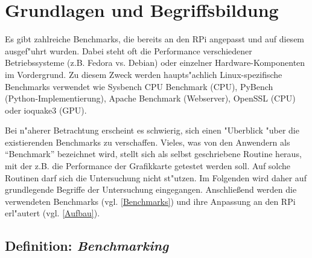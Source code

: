 \chapter{Grundlagen und Begriffsbildung}\label{Kapitel 2}

Es gibt zahlreiche Benchmarks, die bereits an den RPi angepasst und auf diesem ausgef"uhrt wurden. Dabei steht oft die Performance verschiedener Betriebssysteme (z.B. Fedora vs. Debian) oder einzelner Hardware-Komponen\-ten im Vordergrund. Zu diesem Zweck werden haupts"achlich Linux-spezifische Benchmarks verwendet wie Sysbench CPU Benchmark (CPU), PyBench (Python-Implementierung), Apache Benchmark (Webserver), Open\-SSL (CPU) oder ioquake3 (GPU). 

Bei n"aherer Betrachtung erscheint es schwierig, sich einen "Uberblick "uber die existierenden Benchmarks zu verschaffen. Vieles, was von den Anwendern als "`Benchmark"' bezeichnet wird, stellt sich als selbst geschriebene Routine heraus, mit der z.B. die Performance der Grafikkarte getestet werden soll. Auf solche Routinen darf sich die Untersuchung nicht st"utzen. Im Folgenden wird daher auf grundlegende Begriffe der Untersuchung eingegangen. Anschlie\ss end werden die verwendeten Benchmarks (vgl. \ref{Benchmarks}) und ihre Anpassung an den RPi erl"autert (vgl. \ref{Aufbau}). 

\section{Definition: \textit{Benchmarking}}\label{Benchmarking}

